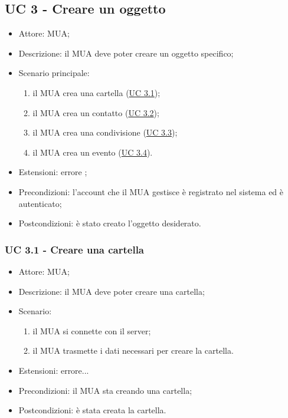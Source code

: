     \subsection{UC 3 - Creare un oggetto} \label{sec: UC 3}
    \begin{itemize}
        \item Attore: MUA;
        \item Descrizione: il MUA deve poter creare un oggetto specifico;
        \item Scenario principale:
            \begin{enumerate}
            \item il MUA crea una cartella (\hyperref[sec: UC 3.1]{UC 3.1});
            \item il MUA crea un contatto (\hyperref[sec: UC 3.2]{UC 3.2});
            \item il MUA crea una condivisione (\hyperref[sec: UC 3.3]{UC 3.3});
            \item il MUA crea un evento (\hyperref[sec: UC 3.4]{UC 3.4}).
            \end{enumerate}
        \item Estensioni: errore ;
        \item Precondizioni: l’account che il MUA gestisce è registrato nel sistema ed è autenticato;
        \item Postcondizioni: è stato creato l’oggetto desiderato.
    \end{itemize}

    \subsubsection{UC 3.1 - Creare una cartella} \label{sec: UC 3.1}
    \begin{itemize}
        \item Attore: MUA;
        \item Descrizione: il MUA deve poter creare una cartella;
        \item Scenario:
            \begin{enumerate}
            \item il MUA si connette con il server;
            \item il MUA trasmette i dati necessari per creare la cartella.
            \end{enumerate}
        \item Estensioni: errore...
        \item Precondizioni: il MUA sta creando una cartella;
        \item Postcondizioni: è stata creata la cartella.
    \end{itemize}

